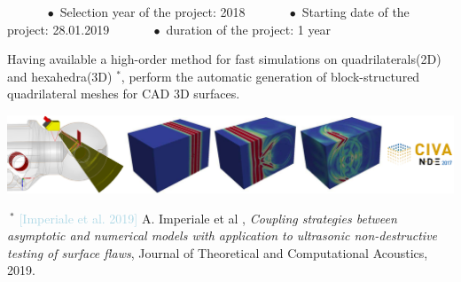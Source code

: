 \documentclass[a0paper,portrait, fontscale=0.30]{baposter}
\begin{document}
\begin{poster}
{\begin{minipage}[b]{1.0\linewidth}
\noindent
\begin{tcolorbox}[colframe=gray,boxrule=0.0pt,colback=lightgray]
\vspace{-0.1cm}
$\ \ \ \ \ \ \ \ \ \ \ \ \ \ \bullet$ Selection year of the project: 2018 $\ \ \ \ \ \ \ \ \ \ \ \ \ \ \bullet$ Starting date of the project: 28.01.2019 $\ \ \ \ \ \ \ \ \ \ \ \ \ \ \bullet$ duration of the project: 1 year$\ \ \ \ \ \ \ \ \ \ \ \ \ \ $%
\vspace{-0.1cm}
\end{tcolorbox}
\vspace{-0.1cm}
\end{minipage}
\newline
\begin{minipage}[b]{0.4\linewidth}
Having available a high-order method for fast simulations on quadrilaterals(2D) and hexahedra(3D) $^{*}$,
perform the automatic generation of block-structured quadrilateral
meshes for CAD 3D surfaces.
\end{minipage}
\begin{minipage}[b]{0.6\linewidth}
\includegraphics[width=\textwidth]{civa_img_new}%
\end{minipage}
\footnotesize
 $~^*$ \textcolor{lightblue}{[Imperiale et al. 2019]} A. Imperiale et al , \textit{Coupling strategies between asymptotic and numerical models with application to ultrasonic non-destructive testing of surface flaws}, Journal of Theoretical and Computational Acoustics, 2019.
}
\headerbox{Pipeline}{name=pipeline,column=0,row=0,span=2,below=context}{
\vspace{-0.15cm}
\noindent
%		
}
\end{poster}
\end{document}
